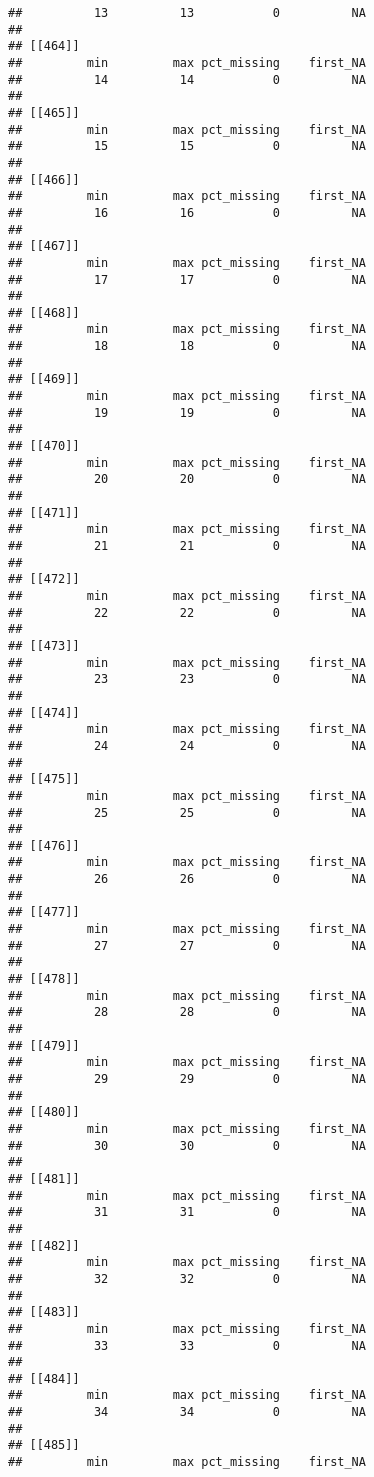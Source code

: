 \documentclass[
]{article}
\begin{document}
\begin{verbatim}
##          13          13           0          NA 
## 
## [[464]]
##         min         max pct_missing    first_NA 
##          14          14           0          NA 
## 
## [[465]]
##         min         max pct_missing    first_NA 
##          15          15           0          NA 
## 
## [[466]]
##         min         max pct_missing    first_NA 
##          16          16           0          NA 
## 
## [[467]]
##         min         max pct_missing    first_NA 
##          17          17           0          NA 
## 
## [[468]]
##         min         max pct_missing    first_NA 
##          18          18           0          NA 
## 
## [[469]]
##         min         max pct_missing    first_NA 
##          19          19           0          NA 
## 
## [[470]]
##         min         max pct_missing    first_NA 
##          20          20           0          NA 
## 
## [[471]]
##         min         max pct_missing    first_NA 
##          21          21           0          NA 
## 
## [[472]]
##         min         max pct_missing    first_NA 
##          22          22           0          NA 
## 
## [[473]]
##         min         max pct_missing    first_NA 
##          23          23           0          NA 
## 
## [[474]]
##         min         max pct_missing    first_NA 
##          24          24           0          NA 
## 
## [[475]]
##         min         max pct_missing    first_NA 
##          25          25           0          NA 
## 
## [[476]]
##         min         max pct_missing    first_NA 
##          26          26           0          NA 
## 
## [[477]]
##         min         max pct_missing    first_NA 
##          27          27           0          NA 
## 
## [[478]]
##         min         max pct_missing    first_NA 
##          28          28           0          NA 
## 
## [[479]]
##         min         max pct_missing    first_NA 
##          29          29           0          NA 
## 
## [[480]]
##         min         max pct_missing    first_NA 
##          30          30           0          NA 
## 
## [[481]]
##         min         max pct_missing    first_NA 
##          31          31           0          NA 
## 
## [[482]]
##         min         max pct_missing    first_NA 
##          32          32           0          NA 
## 
## [[483]]
##         min         max pct_missing    first_NA 
##          33          33           0          NA 
## 
## [[484]]
##         min         max pct_missing    first_NA 
##          34          34           0          NA 
## 
## [[485]]
##         min         max pct_missing    first_NA 

\end{verbatim}
\end{document}
